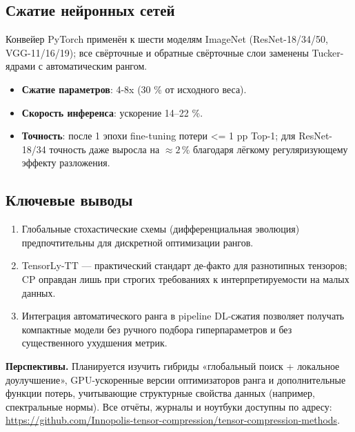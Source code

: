 \subsection*{Сжатие нейронных сетей}
Конвейер PyTorch применён к шести моделям ImageNet (ResNet-18/34/50, VGG-11/16/19); все свёрточные и обратные свёрточные слои заменены Tucker-ядрами с автоматическим рангом.
\begin{itemize}\setlength\itemsep{0.2em}
    \item \textbf{Сжатие параметров}: 4-8x (30 \% от исходного веса).
    \item \textbf{Скорость инференса}: ускорение 14–22 \%.  
    \item \textbf{Точность}: после 1 эпохи fine-tuning потери <= 1 pp Top-1; для ResNet-18/34 точность даже выросла на ${\approx} 2\,\%$ благодаря лёгкому регуляризующему эффекту разложения.
\end{itemize}

\subsection*{Ключевые выводы}
\begin{enumerate}\setlength\itemsep{0.2em}
    \item Глобальные стохастические схемы (дифференциальная эволюция) предпочтительны для дискретной оптимизации рангов.  
    \item TensorLy-TT — практический стандарт де-факто для разнотипных тензоров; CP оправдан лишь при строгих требованиях к интерпретируемости на малых данных.  
    \item Интеграция автоматического ранга в pipeline DL-сжатия позволяет получать компактные модели без ручного подбора гиперпараметров и без существенного ухудшения метрик.
\end{enumerate}

\textbf{Перспективы.} Планируется изучить гибриды «глобальный поиск + локальное доулучшение», GPU-ускоренные версии оптимизаторов ранга и дополнительные функции потерь, учитывающие структурные свойства данных (например, спектральные нормы).  
Все отчёты, журналы и ноутбуки доступны по адресу:  
\url{https://github.com/Innopolis-tensor-compression/tensor-compression-methods}.